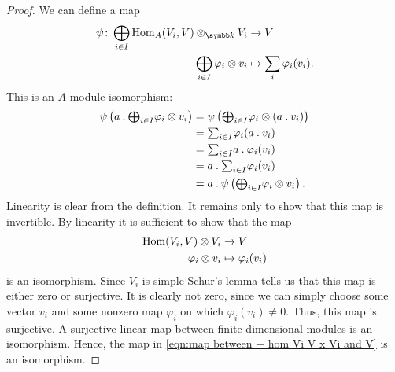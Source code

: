 \begin{lma}{}{}
\begin{proof}
        We can define a map
        \begin{equation}
            \label{eqn:map between + hom Vi V x Vi and V}
            \begin{aligned}
                \psi \colon \bigoplus_{i \in I} \Hom_A(V_i, V) \otimes_{\field} V_i &\to V\\
                \bigoplus_{i \in I} \varphi_i \otimes v_i &\mapsto \sum_i \varphi_i(v_i).
            \end{aligned}
        \end{equation}
        This is an \(A\)-module isomorphism:
        \begin{align}
            \psi\left( a \mathbin{.} {\textstyle \bigoplus_{i \in I}} \varphi_i \otimes v_i \right) &= \psi\left( {\textstyle \bigoplus_{i\in I}} \varphi_i \otimes (a \mathbin{.} v_i) \right)\\
            &= {\textstyle \sum_{i \in I}} \varphi_i(a \mathbin{.} v_i)\\
            &= {\textstyle \sum_{i \in I}} a \mathbin{.} \varphi_i(v_i)\\
            &= a \mathbin{.} {\textstyle \sum_{i \in I}} \varphi_i(v_i)\\
            &= a \mathbin{.} \psi\left( {\textstyle \bigoplus_{i \in I}} \varphi_i \otimes v_i \right).
        \end{align}
        Linearity is clear from the definition.
        It remains only to show that this map is invertible.
        By linearity it is sufficient to show that the map
        \begin{align}
            \operatorname{Hom}(V_i, V) \otimes V_i &\to V\\
            \varphi_i \otimes v_i &\mapsto \varphi_i(v_i)
        \end{align}
        is an isomorphism.
        Since \(V_i\) is simple Schur's lemma tells us that this map is either zero or surjective.
        It is clearly not zero, since we can simply choose some vector \(v_i\) and some nonzero map \(\varphi_i\) on which \(\varphi_i(v_i) \ne 0\).
        Thus, this map is surjective.
        A surjective linear map between finite dimensional modules is an isomorphism.
        Hence, the map in \cref{eqn:map between + hom Vi V x Vi and V} is an isomorphism.
        

\end{proof}
\end{lma}
